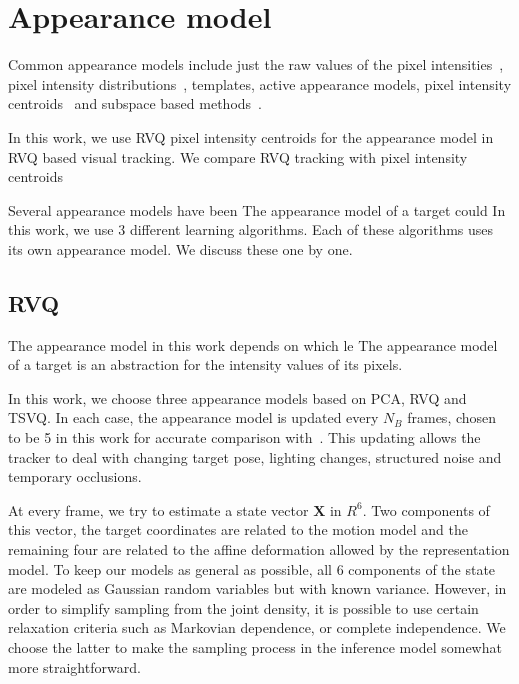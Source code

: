 \section{Appearance model}
\label{Sec:RVQ_trk_appearance_model}
Common appearance models include just the raw values of the pixel intensities~\cite{2000_CNF_TRK_Mallet, 1981_JNL_OpticalFlow_HornSchunck}, pixel intensity distributions~\cite{2002_JNL_MeanShiftFeatureSpaceAnalysis_Comaniciu, 1996_JNL_TRK_Zhu, 2002_JNL_TRK_Paragios, 2002_JNL_TRK_Elgammal}, templates\cite{1997_CNF_TRK_Fieguth}, active appearance models\cite{1998_CNF_ActiveModels_Edwards, 1995_JNL_ActiveModels_Cootes}, pixel intensity centroids~\cite{1997_CNF_TRK_Heisele} and subspace based methods~\cite{1997_JNL_EigenTRK_Moghaddam, 1998_JNL_Eigentracking_Black}.  

In this work, we use RVQ pixel intensity centroids for the appearance model in RVQ based visual tracking.  We compare RVQ tracking with pixel intensity centroids 

Several appearance models have been The appearance model of a target could 
In this work, we use 3 different learning algorithms.  Each of these algorithms uses its own appearance model.  We discuss these one by one.

\subsection{RVQ}
The appearance model in this work depends on which le
The appearance model of a target is an abstraction for the intensity values of its pixels.  

In this work, we choose three appearance models based on PCA, RVQ and TSVQ.  In each case, the appearance model is updated every $N_B$ frames, chosen to be 5 in this work for accurate comparison with~\cite{2008_JNL_subspaceTRK_Ross}.    This updating allows the tracker to deal with changing target pose, lighting changes, structured noise and temporary occlusions.   




\newpage
At every frame, we try to estimate a state vector $\mathbf{X}$ in $R^6$.  Two components of this vector, the target coordinates are related to the motion model and the remaining four are related to the affine deformation allowed by the representation model.  To keep our models as general as possible, all 6 components of the state are modeled as Gaussian random variables but with known variance.  However, in order to simplify sampling from the joint density, it is possible to use certain relaxation criteria such as Markovian dependence, or complete independence.  We choose the latter to make the sampling process in the inference model somewhat more straightforward.

